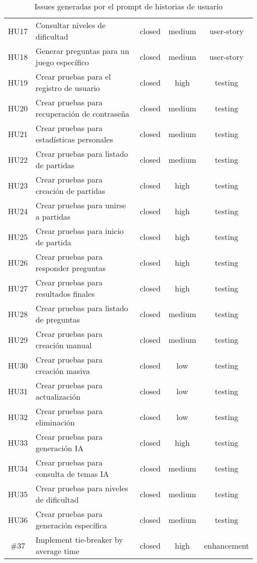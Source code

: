 \documentclass[12pt,a4paper]{article}
\begin{document}
\begin{table}[h]
\begin{tabular}{|c|l|c|c|c|}
HU17 & Consultar niveles de dificultad & closed & medium & user-story \\
HU18 & Generar preguntas para un juego específico & closed & medium & user-story \\
HU19 & Crear pruebas para el registro de usuario & closed & high & testing \\
HU20 & Crear pruebas para recuperación de contraseña & closed & medium & testing \\
HU21 & Crear pruebas para estadísticas personales & closed & medium & testing \\
HU22 & Crear pruebas para listado de partidas & closed & medium & testing \\
HU23 & Crear pruebas para creación de partidas & closed & high & testing \\
HU24 & Crear pruebas para unirse a partidas & closed & high & testing \\
HU25 & Crear pruebas para inicio de partida & closed & high & testing \\
HU26 & Crear pruebas para responder preguntas & closed & high & testing \\
HU27 & Crear pruebas para resultados finales & closed & high & testing \\
HU28 & Crear pruebas para listado de preguntas & closed & medium & testing \\
HU29 & Crear pruebas para creación manual & closed & medium & testing \\
HU30 & Crear pruebas para creación masiva & closed & low & testing \\
HU31 & Crear pruebas para actualización & closed & low & testing \\
HU32 & Crear pruebas para eliminación & closed & low & testing \\
HU33 & Crear pruebas para generación IA & closed & high & testing \\
HU34 & Crear pruebas para consulta de temas IA & closed & medium & testing \\
HU35 & Crear pruebas para niveles de dificultad & closed & medium & testing \\
HU36 & Crear pruebas para generación específica & closed & medium & testing \\
\#37 & Implement tie-breaker by average time & closed & high & enhancement \\
\hline
\end{tabular}
\caption{Issues generadas por el prompt de historias de usuario}
\label{tab:issues}
\end{table}
\end{document}
